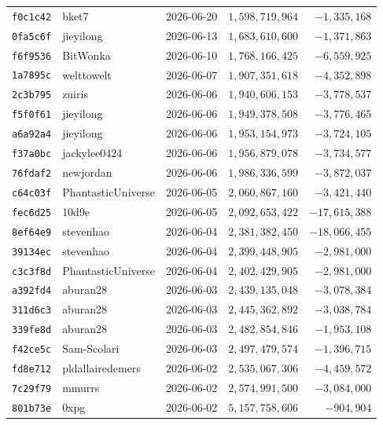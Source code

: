 {\begin{longtable}{@{}lllrr@{}}
\texttt{f0c1c42} & bket7 & 2026-06-20 & $1{,}598{,}719{,}964$ & $-1{,}335{,}168$\\
\texttt{0fa5c6f} & jieyilong & 2026-06-13 & $1{,}683{,}610{,}600$ & $-1{,}371{,}863$\\
\texttt{f6f9536} & BitWonka & 2026-06-10 & $1{,}768{,}166{,}425$ & $-6{,}559{,}925$\\
\texttt{1a7895c} & welttowelt & 2026-06-07 & $1{,}907{,}351{,}618$ & $-4{,}352{,}898$\\
\texttt{2c3b795} & zuiris & 2026-06-06 & $1{,}940{,}606{,}153$ & $-3{,}778{,}537$\\
\texttt{f5f0f61} & jieyilong & 2026-06-06 & $1{,}949{,}378{,}508$ & $-3{,}776{,}465$\\
\texttt{a6a92a4} & jieyilong & 2026-06-06 & $1{,}953{,}154{,}973$ & $-3{,}724{,}105$\\
\texttt{f37a0bc} & jackylee0424 & 2026-06-06 & $1{,}956{,}879{,}078$ & $-3{,}734{,}577$\\
\texttt{76fdaf2} & newjordan & 2026-06-06 & $1{,}986{,}336{,}599$ & $-3{,}872{,}037$\\
\texttt{c64c03f} & PhantasticUniverse & 2026-06-05 & $2{,}060{,}867{,}160$ & $-3{,}421{,}440$\\
\texttt{fec6d25} & 10d9e & 2026-06-05 & $2{,}092{,}653{,}422$ & $-17{,}615{,}388$\\
\texttt{8ef64e9} & stevenhao & 2026-06-04 & $2{,}381{,}382{,}450$ & $-18{,}066{,}455$\\
\texttt{39134ec} & stevenhao & 2026-06-04 & $2{,}399{,}448{,}905$ & $-2{,}981{,}000$\\
\texttt{c3c3f8d} & PhantasticUniverse & 2026-06-04 & $2{,}402{,}429{,}905$ & $-2{,}981{,}000$\\
\texttt{a392fd4} & aburan28 & 2026-06-03 & $2{,}439{,}135{,}048$ & $-3{,}078{,}384$\\
\texttt{311d6c3} & aburan28 & 2026-06-03 & $2{,}445{,}362{,}892$ & $-3{,}038{,}784$\\
\texttt{339fe8d} & aburan28 & 2026-06-03 & $2{,}482{,}854{,}846$ & $-1{,}953{,}108$\\
\texttt{f42ce5c} & Sam-Scolari & 2026-06-03 & $2{,}497{,}479{,}574$ & $-1{,}396{,}715$\\
\texttt{fd8e712} & pldallairedemers & 2026-06-02 & $2{,}535{,}067{,}306$ & $-4{,}459{,}572$\\
\texttt{7c29f79} & mmurrs & 2026-06-02 & $2{,}574{,}991{,}500$ & $-3{,}084{,}000$\\
\texttt{801b73e} & 0xpg & 2026-06-02 & $5{,}157{,}758{,}606$ & $-904{,}904$\\

\end{longtable}}
